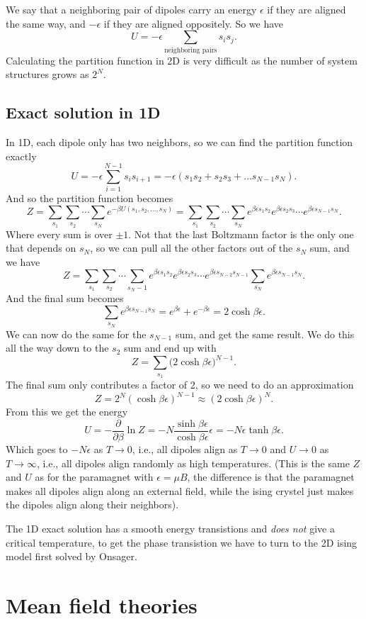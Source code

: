 \documentclass[a4paper, 11pt, notitlepage, english]{article}
\newcommand{\eps}{\epsilon}
\newcommand{\p}{\partial}
\begin{document}
We say that a neighboring pair of dipoles carry an energy $\eps$ if they are aligned the same way, and $-\eps$ if they are aligned oppositely. So we have
$$U = - \eps \sum_{\mbox{neighboring pairs}} s_is_j.$$
Calculating the partition function in 2D is very difficult as the number of system structures grows as $2^N$. 

\subsection*{Exact solution in 1D}
In 1D, each dipole only has two neighbors, so we can find the partition function exactly
$$U = -\eps \sum_{i=1}^{N-1} s_i s_{i+1} = -\eps(s_1s_2 + s_2s_3 + \ldots s_{N-1}s_N).$$
And so the partition function becomes
$$Z = \sum_{s_1}\sum_{s_2}\cdots\sum_{s_N}e^{-\beta U(s_1,s_2,\ldots,s_N)} =  \sum_{s_1}\sum_{s_2}\cdots\sum_{s_N} e^{\beta \eps s_1s_2}e^{\beta \eps s_2s_3}\cdots e^{\beta \eps s_{N-1}s_{N}}.$$
Where every sum is over $\pm 1$. Not that the last Boltzmann factor is the only one that depends on $s_N$, so we can pull all the other factors out of the $s_N$ sum, and we have
$$Z = \sum_{s_1}\sum_{s_2}\cdots\sum_{s_N-1} e^{\beta \eps s_1s_2}e^{\beta \eps s_2s_3}\cdots e^{\beta \eps s_{N-2}s_{N-1}} \sum_{s_N} e^{\beta \eps s_{N-1}s_{N}}.$$
And the final sum becomes
$$\sum_{s_N} e^{\beta \eps s_{N-1}s_{N}} = e^{\beta \eps} + e^{-\beta \eps} = 2\cosh\beta \eps.$$
We can now do the same for the $s_{N-1}$ sum, and get the same result. We do this all the way down to the $s_2$ sum and end up with
$$Z = \sum_{s_1} \big(2\cosh \beta \eps \big)^{N-1}.$$
The final sum only contributes a factor of 2, so we need to do an approximation
$$Z = 2^N (\cosh \beta \eps)^{N-1} \approx (2 \cosh \beta \eps)^N.$$
From this we get the energy
$$U = -\frac{\p}{\p \beta} \ln Z = -N \frac{\sinh \beta \eps}{\cosh \beta \eps} \eps = - N\eps \tanh \beta \eps.$$
Which goes to $-N\eps$ as $T\to 0$, i.e., all dipoles align as $T\to 0$ and $U \to 0$ as $T \to \infty$, i.e., all dipoles align randomly as high temperatures. (This is the same $Z$ and $U$ as for the paramagnet with $\eps = \mu B$, the difference is that the paramagnet makes all dipoles align along an external field, while the ising crystel just makes the dipoles align along their neighbors).

The 1D exact solution has a smooth energy transistions and \emph{does not} give a critical temperature, to get the phase transistion we have to turn to the 2D ising model first solved by Onsager.

\section*{Mean field theories}
\end{document}

